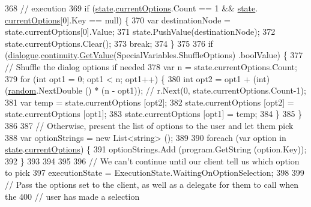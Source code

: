 \begin{DoxyCode}
368                 \textcolor{comment}{// execution}
369                 \textcolor{keywordflow}{if} (\hyperlink{a00072_a70f2ce6201cdd2430ceaa764ac614ca0}{state}.\hyperlink{a00075_ab816dfea32ecda23282700f01454e0a9}{currentOptions}.Count == 1 && \hyperlink{a00072_a70f2ce6201cdd2430ceaa764ac614ca0}{state}.
      \hyperlink{a00075_ab816dfea32ecda23282700f01454e0a9}{currentOptions}[0].Key == null) \{
370                     var destinationNode = state.currentOptions[0].Value;
371                     state.PushValue(destinationNode);
372                     state.currentOptions.Clear();
373                     \textcolor{keywordflow}{break};
374                 \}
375 
376                 \textcolor{keywordflow}{if} (\hyperlink{a00072_ac506426c503da5f033247c29e11c5e82}{dialogue}.\hyperlink{a00036_ae94eaa4b03b432422f5d205fabe37ff5}{continuity}.\hyperlink{a00088_accab1fc5c8fc353dbfc53ca0f4029576}{GetValue}(SpecialVariables.ShuffleOptions)
      .boolValue) \{
377                     \textcolor{comment}{// Shuffle the dialog options if needed}
378                     var n = state.currentOptions.Count;
379                     \textcolor{keywordflow}{for} (\textcolor{keywordtype}{int} opt1 = 0; opt1 < n; opt1++) \{
380                         \textcolor{keywordtype}{int} opt2 = opt1 + (int)(\hyperlink{a00072_a408485a00c7cc558428c86ed9dd04fca}{random}.NextDouble () * (n - opt1)); \textcolor{comment}{// r.Next(0,
       state.currentOptions.Count-1);}
381                         var temp = state.currentOptions [opt2];
382                         state.currentOptions [opt2] = state.currentOptions [opt1];
383                         state.currentOptions [opt1] = temp;
384                     \}
385                 \}
386 
387                 \textcolor{comment}{// Otherwise, present the list of options to the user and let them pick}
388                 var optionStrings = \textcolor{keyword}{new} List<string> ();
389 
390                 \textcolor{keywordflow}{foreach} (var option \textcolor{keywordflow}{in} \hyperlink{a00072_a70f2ce6201cdd2430ceaa764ac614ca0}{state}.\hyperlink{a00075_ab816dfea32ecda23282700f01454e0a9}{currentOptions}) \{
391                     optionStrings.Add (program.GetString (option.Key));
392                 \}
393 
394 
395 
396                 \textcolor{comment}{// We can't continue until our client tell us which option to pick}
397                 executionState = ExecutionState.WaitingOnOptionSelection;
398 
399                 \textcolor{comment}{// Pass the options set to the client, as well as a delegate for them to call when the}
400                 \textcolor{comment}{// user has made a selection}

\end{DoxyCode}
